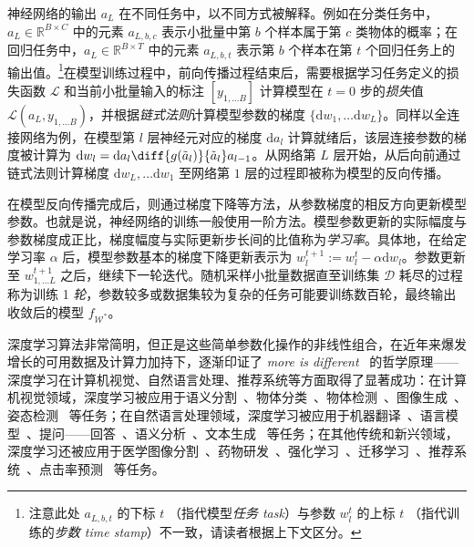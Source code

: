 神经网络的输出 $a_L$ 在不同任务中，以不同方式被解释。例如在分类任务中，$a_L \in \mathbb{R}^{B \times C}$ 中的元素 $a_{L, b, c}$ 表示小批量中第 $b$ 个样本属于第 $c$ 类物体的概率；在回归任务中，$a_L \in \mathbb{R}^{B \times T}$ 中的元素 $a_{L, b, t}$ 表示第 $b$ 个样本在第 $t$ 个回归任务上的输出值。\footnote{注意此处 $a_{L, b, t}$ 的下标 $t$ （指代模型\emph{任务 task}）与参数 $w_l^t$ 的上标 $t$ （指代训练的\emph{步数 time stamp}）不一致，请读者根据上下文区分。}在模型训练过程中，前向传播过程结束后，需要根据学习任务定义的损失函数 $\mathcal{L}$ 和当前小批量输入的标注 $[y_{1, \ldots B}]$ 计算模型在 $t=0$ 步的\emph{损失}值 $\mathcal{L}(a_L, y_{1, \ldots B})$，并根据\emph{链式法则}计算模型参数的梯度 $\{\mathrm{d}w_1, \ldots \mathrm{d}w_L\}$。同样以全连接网络为例，在模型第 $l$ 层神经元对应的梯度 $\mathrm{d} a_l$ 计算就绪后，该层连接参数的梯度被计算为 $\mathrm{d} w_l = \mathrm{d} a_l \diff{g(\tilde{a}_l)}{\tilde{a}_l} a_{l-1}$。从网络第 $L$ 层开始，从后向前通过链式法则计算梯度 $\mathrm{d}w_L, \ldots \mathrm{d}w_1$ 至网络第 $1$ 层的过程即被称为模型的反向传播。

在模型反向传播完成后，则通过梯度下降等方法，从参数梯度的相反方向更新模型参数。也就是说，神经网络的训练一般使用一阶方法。模型参数更新的实际幅度与参数梯度成正比，梯度幅度与实际更新步长间的比值称为\emph{学习率}。具体地，在给定学习率 $\alpha$ 后，模型参数基本的梯度下降更新表示为 $w_l^{t+1} := w_l^t - \alpha \mathrm{d} w_l$。参数更新至 $w_{1, \ldots L}^{t+1}$ 之后，继续下一轮迭代。随机采样小批量数据直至训练集 $\mathcal{D}$ 耗尽的过程称为训练 1 \emph{轮}，参数较多或数据集较为复杂的任务可能要训练数百轮，最终输出收敛后的模型 $f_{\mathcal{W}^*}$。

深度学习算法非常简明，但正是这些简单参数化操作的非线性组合，在近年来爆发增长的可用数据及计算力加持下，逐渐印证了 \emph{more is different}~\citep{anderson1972more} 的哲学原理——深度学习在计算机视觉、自然语言处理、推荐系统等方面取得了显著成功：在计算机视觉领域，深度学习被应用于语义分割~\citep{yuan2019object}、物体分类~\citep{xie2019self}、物体检测~\citep{liu2019cbnet}、图像生成~\citep{song2019generative}、姿态检测~\citep{bulat2020toward} 等任务；在自然语言处理领域，深度学习被应用于机器翻译~\citep{edunov2018understanding}、语言模型~\citep{shoeybi2019megatron}、提问——回答~\citep{zhang2020retrospective}、语义分析~\citep{raffel2019exploring}、文本生成~\citep{guo2018long} 等任务；在其他传统和新兴领域，深度学习还被应用于医学图像分割~\citep{ronneberger2015u}、药物研发~\citep{alperstein2019all}、强化学习~\citep{mnih2015human}、迁移学习~\citep{wang2019easy}、推荐系统~\citep{rendle2019difficulty}、点击率预测~\citep{deng2020sparse} 等任务。
